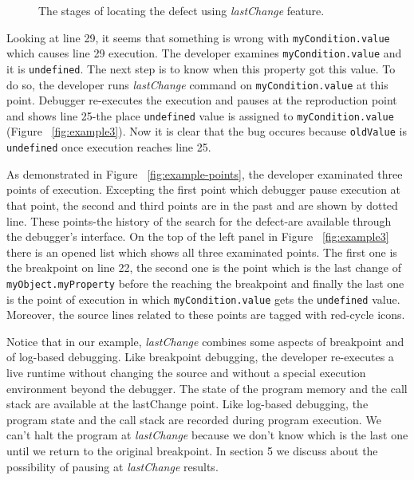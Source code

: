 \documentclass[preprint]{sigplanconf}
\begin{document}
\begin{figure}[htp]
\caption{The stages of locating the defect using \textit{lastChange} feature.}
\label{fig:lastChange}
\end{figure}

Looking at line 29, it seems that something is wrong with
\texttt{myCondition.value} which causes line 29 execution. The
developer examines \texttt{myCondition.value} and it is
\texttt{undefined}. The next step is to know when this property got
this value. To do so, the developer runs \textit{lastChange} command
on \texttt{myCondition.value} at this point. Debugger re-executes the
execution and pauses at the reproduction point and shows line 25-the
place \texttt{undefined} value is assigned to
\texttt{myCondition.value} (Figure ~\ref{fig:example3}). Now it is
clear that the bug occures because \texttt{oldValue} is
\texttt{undefined} once execution reaches line 25.

As demonstrated in Figure ~\ref{fig:example-points}, the developer
examinated three points of execution. Excepting the first point which
debugger pause execution at that point, the second and third points
are in the past and are shown by dotted line. These points-the history
of the search for the defect-are available through the debugger's
interface. On the top of the left panel in Figure ~\ref{fig:example3}
there is an opened list which shows all three examinated points. The
first one is the breakpoint on line 22, the second one is the point
which is the last change of \texttt{myObject.myProperty} before the
reaching the breakpoint and finally the last one is the point of
execution in which \texttt{myCondition.value} gets the
\texttt{undefined} value. Moreover, the source lines related to these
points are tagged with red-cycle icons.

Notice that in our example, \textit{lastChange} combines some aspects
of breakpoint and of log-based debugging. Like breakpoint debugging,
the developer re-executes a live runtime without changing the source
and without a special execution environment beyond the debugger. The
state of the program memory and the call stack are available at the
lastChange point. Like log-based debugging, the program state and the
call stack are recorded during program execution. We can't halt the
program at \textit{lastChange} because we don't know which is the last
one until we return to the original breakpoint. In section 5 we
discuss about the possibility of pausing at \textit{lastChange}
results.

\end{document}
